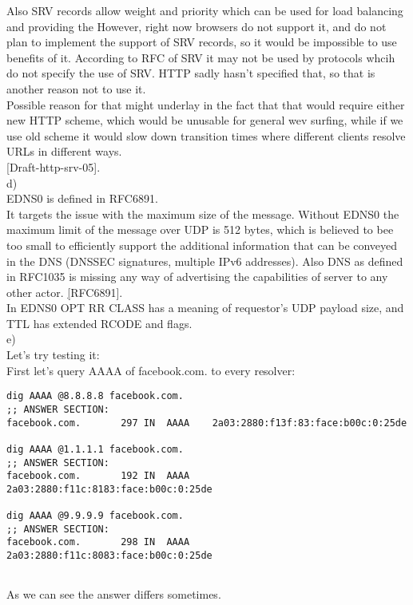 \documentclass[a4paper]{article}
\begin{document}
Also SRV records allow weight and priority which can be used for load balancing and providing the 
However, right now browsers do not support it, and do not plan to implement the support of SRV records, so it would be impossible to use benefits of it. According to RFC of SRV it may not be used by protocols whcih do not specify the use of SRV. HTTP sadly hasn't specified that, so that is another reason not to use it.\\
Possible reason for that might underlay in the fact that that would require either new HTTP scheme, which would be unusable for general wev surfing, while if we use old scheme it would slow down transition times where different clients resolve URLs in different ways.\\ \href{https://tools.ietf.org/html/draft-jennings-http-srv-05}[Draft-http-srv-05].\\
d)\\
EDNS0 is defined in RFC6891.\\
It targets the issue with the maximum size of the message. Without EDNS0 the maximum limit of the message over UDP is 512 bytes, which is believed to bee too small to efficiently support the additional information that can be conveyed in the DNS (DNSSEC signatures, multiple IPv6 addresses). Also DNS as defined in RFC1035 is missing any way of advertising the capabilities of server to any other actor. \href{https://tools.ietf.org/html/rfc6891}[RFC6891].\\
In EDNS0 OPT RR CLASS has a meaning of requestor's UDP payload size, and TTL has extended RCODE and flags.\\
e)\\
Let's try testing it:\\
First let's query AAAA of facebook.com. to every resolver:\\
\begin{verbatim}
dig AAAA @8.8.8.8 facebook.com.
;; ANSWER SECTION:
facebook.com.		297	IN	AAAA	2a03:2880:f13f:83:face:b00c:0:25de

dig AAAA @1.1.1.1 facebook.com.
;; ANSWER SECTION:
facebook.com.		192	IN	AAAA	2a03:2880:f11c:8183:face:b00c:0:25de

dig AAAA @9.9.9.9 facebook.com.
;; ANSWER SECTION:
facebook.com.		298	IN	AAAA	2a03:2880:f11c:8083:face:b00c:0:25de


\end{verbatim}
As we can see the answer differs sometimes. \\
\end{document}
